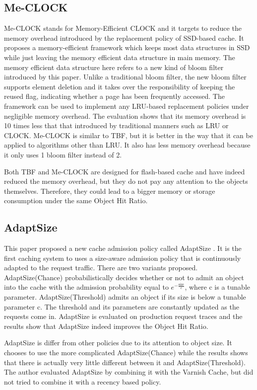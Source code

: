 \documentclass[journal,10.5pt,onecolumn]{IEEEtran}
\begin{document}
\subsection{Me-CLOCK}
Me-CLOCK \cite{b3} stands for Memory-Efficient CLOCK and it targets to reduce the memory overhead introduced by the replacement policy of SSD-based cache. It proposes a memory-efficient framework which keeps most data structures in SSD while just leaving the memory efficient data structure in main memory.
The memory efficient data structure here refers to a new kind of bloom filter introduced by this paper. Unlike a traditional bloom filter, the new bloom filter supports element deletion and it takes over the responsibility of keeping the reused flag, indicating whether a page has been frequently accessed. The framework can be used to implement any LRU-based replacement policies under negligible memory overhead. The evaluation shows that its memory overhead is 10 times less that that introduced by traditional manners such as LRU or CLOCK.
Me-CLOCK is similar to TBF, but it is better in the way that it can be applied to algorithms other than LRU. It also has less memory overhead because it only uses 1 bloom filter instead of 2.

Both TBF and Me-CLOCK are designed for flash-based cache and have indeed reduced the memory overhead, but they do not pay any attention to the objects themselves. Therefore, they could lead to a bigger memory or storage consumption under the same Object Hit Ratio.

\subsection{AdaptSize}
This paper proposed a new cache admission policy called AdaptSize \cite{b4}. It is the first caching system to uses a size-aware admission policy that is continuously adapted to the request traffic. There are two variants proposed. AdaptSize(Chance) probabilistically decides whether or not to admit an object into the cache with the admission probability equal to $e^{-\frac{\text{size}}{c}}$, where c is a tunable parameter. AdaptSize(Threshold) admits an object if its size is below a tunable parameter c. The threshold and its parameters are constantly updated as the requests come in. AdaptSize is evaluated on production request traces and the results show that AdaptSize indeed improves the Object Hit Ratio.

AdaptSize is differ from other policies due to its attention to object size. It chooses to use the more complicated AdaptSize(Chance) while the results shows that there is actually very little different between it and AdaptSize(Threshold). The author evaluated AdaptSize by combining it with the Varnish Cache, but did not tried to combine it with a recency based policy.
\end{document}
